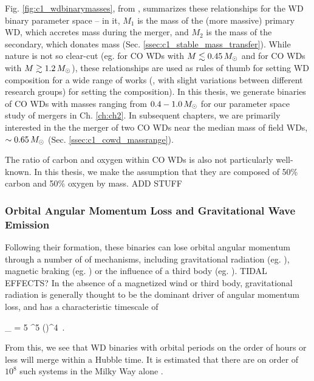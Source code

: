 Fig. \ref{fig:c1_wdbinarymasses}, from \cite{dan+12}, summarizes these relationships for the WD binary parameter space -- in it, $M_1$ is the mass of the (more massive) primary WD, which accretes mass during the merger, and $M_2$ is the mass of the secondary, which donates mass (Sec. \ref{ssec:c1_stable_mass_transfer}).  While nature is not so clear-cut (eg. \citealt{ibent85, moros09} for CO WDs with $M\lesssim0.45\,\Msun$ and \citealt{hurlpt00} for CO WDs with $M\gtrsim1.2\,\Msun$), these relationships are used as rules of thumb for setting WD composition for a wide range of works (\citealt{loreig09,rask+12,dan+12,dan+14}, with slight variations between different research groups) for setting the composition).  In this thesis, we generate binaries of CO WDs with masses ranging from $0.4 - 1.0\,\Msun$ for our parameter space study of mergers in Ch. \ref{ch:ch2}.  In subsequent chapters, we are primarily interested in the the merger of two CO WDs near the median mass of field WDs, $\sim0.65\,\Msun$ (Sec. \ref{ssec:c1_cowd_massrange}).

The ratio of carbon and oxygen within CO WDs is also not particularly well-known.  In this thesis, we make the assumption that they are composed of 50\% carbon and 50\% oxygen by mass.  {\charles ADD STUFF}

\subsubsection{Orbital Angular Momentum Loss and Gravitational Wave Emission}

Following their formation, these binaries can lose orbital angular momentum through a number of of mechanisms, including gravitational radiation (eg. \citealt{petem63}), magnetic braking (eg. \citealt{verb84}) or the influence of a third body (eg. \citealt{katzd12}).  {\charles TIDAL EFFECTS?}  In the absence of a magnetized wind or third body, gravitational radiation is generally thought to be the dominant driver of angular momentum loss, and has a characteristic timescale of \citep{segrcm97}

\eqbegin
\tau_{} = 5 ^5 \left(\right)^4 \frac{\Msun}{\Ma} \frac{\Msun}{\Md} \frac{\Msun}{\Mtot}\,.
\label{eq:c1_gravtimescale}
\eqend

\noindent From this, we see that WD binaries with orbital periods on the order of hours or less will merge within a Hubble time.  It is estimated that there are on order of $10^8$ such systems in the Milky Way alone \citep{mars11}.

